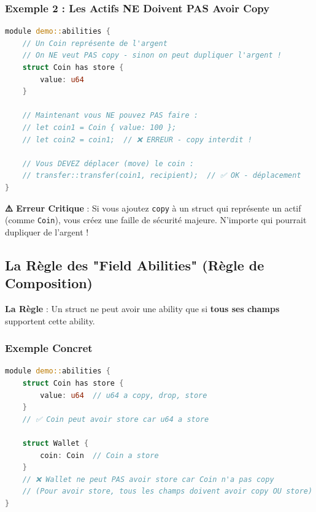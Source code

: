 \documentclass[11pt]{article}
\begin{document}
\subsubsection{Exemple 2 : Les Actifs NE Doivent PAS Avoir Copy}

\begin{lstlisting}[language=Rust, caption=Coin SANS Copy - C'est Correct]
module demo::abilities {
    // Un Coin représente de l'argent
    // On NE veut PAS copy - sinon on peut dupliquer l'argent !
    struct Coin has store {
        value: u64
    }
    
    // Maintenant vous NE pouvez PAS faire :
    // let coin1 = Coin { value: 100 };
    // let coin2 = coin1;  // ❌ ERREUR - copy interdit !
    
    // Vous DEVEZ déplacer (move) le coin :
    // transfer::transfer(coin1, recipient);  // ✅ OK - déplacement
}
\end{lstlisting}

\begin{warnBox}
\textbf{⚠️ Erreur Critique} : Si vous ajoutez \texttt{copy} à un struct qui représente un actif (comme \texttt{Coin}), vous créez une faille de sécurité majeure. N'importe qui pourrait dupliquer de l'argent !
\end{warnBox}

\subsection{La Règle des "Field Abilities" (Règle de Composition)}

\begin{explainBox}
\textbf{La Règle} : Un struct ne peut avoir une ability que si \textbf{tous ses champs} supportent cette ability.
\end{explainBox}

\subsubsection{Exemple Concret}

\begin{lstlisting}[language=Rust, caption=Exemple de Field Ability Rule]
module demo::abilities {
    struct Coin has store {
        value: u64  // u64 a copy, drop, store
    }
    // ✅ Coin peut avoir store car u64 a store
    
    struct Wallet {
        coin: Coin  // Coin a store
    }
    // ❌ Wallet ne peut PAS avoir store car Coin n'a pas copy
    // (Pour avoir store, tous les champs doivent avoir copy OU store)
}
\end{lstlisting}
\end{document}
